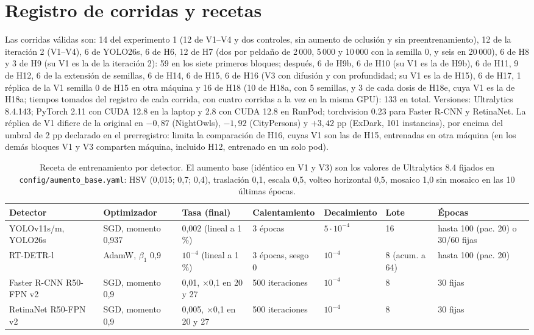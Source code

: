 \documentclass[10pt]{article}
\begin{document}


\section{Registro de corridas y recetas}
Las corridas válidas son: 14 del experimento 1 (12 de V1--V4 y dos controles, sin aumento de oclusión y sin preentrenamiento), 12 de la iteración 2 (V1--V4), 6 de YOLO26s, 6 de H6, 12 de H7 (dos por peldaño de 2\,000, 5\,000 y 10\,000 con la semilla 0, y seis en 20\,000), 6 de H8 y 3 de H9 (su V1 es la de la iteración 2): 59 en los siete primeros bloques; después, 6 de H9b, 6 de H10 (su V1 es la de H9b), 6 de H11, 9 de H12, 6 de la extensión de semillas, 6 de H14, 6 de H15, 6 de H16 (V3 con difusión y con profundidad; su V1 es la de H15), 6 de H17, 1 réplica de la V1 semilla 0 de H15 en otra máquina y 16 de H18 (10 de H18a, con 5 semillas, y 3 de cada dosis de H18e, cuya V1 es la de H18a; tiempos tomados del registro de cada corrida, con cuatro corridas a la vez en la misma GPU): 133 en total. Versiones: Ultralytics 8.4.143; PyTorch 2.11 con CUDA 12.8 en la laptop y 2.8 con CUDA 12.8 en RunPod; torchvision 0.23 para Faster R-CNN y RetinaNet. La réplica de V1 difiere de la original en $-0{,}87$ (NightOwls), $-1{,}92$ (CityPersons) y $+3{,}42$ pp (ExDark, 101 instancias), por encima del umbral de 2 pp declarado en el prerregistro: limita la comparación de H16, cuyas V1 son las de H15, entrenadas en otra máquina (en los demás bloques V1 y V3 comparten máquina, incluido H12, entrenado en un solo pod).



\begin{table}[H]\centering\small
\caption{Receta de entrenamiento por detector. El aumento base (idéntico en V1 y V3) son los valores de Ultralytics 8.4 fijados en \texttt{config/aumento\_base.yaml}: HSV (0,015; 0,7; 0,4), traslación 0,1, escala 0,5, volteo horizontal 0,5, mosaico 1,0 sin mosaico en las 10 últimas épocas.}
\begin{tabular}{@{}p{2.6cm}p{2.2cm}p{2.6cm}p{1.9cm}p{1.6cm}p{1.6cm}p{2.6cm}@{}}\toprule
Detector & Optimizador & Tasa (final) & Calentamiento & Decaimiento & Lote & Épocas \\\midrule
YOLOv11s/m, YOLO26s & SGD, momento 0,937 & 0,002 (lineal a 1\,\%) & 3 épocas & $5\cdot10^{-4}$ & 16 & hasta 100 (pac. 20) o 30/60 fijas \\
RT-DETR-l & AdamW, $\beta_1$ 0,9 & $10^{-4}$ (lineal a 1\,\%) & 3 épocas, sesgo 0 & $10^{-4}$ & 8 (acum. a 64) & hasta 100 (pac. 20) \\
Faster R-CNN R50-FPN v2 & SGD, momento 0,9 & 0,01, $\times$0,1 en 20 y 27 & 500 iteraciones & $10^{-4}$ & 8 & 30 fijas \\
RetinaNet R50-FPN v2 & SGD, momento 0,9 & 0,005, $\times$0,1 en 20 y 27 & 500 iteraciones & $10^{-4}$ & 8 & 30 fijas \\
\bottomrule\end{tabular}\end{table}
\end{document}
